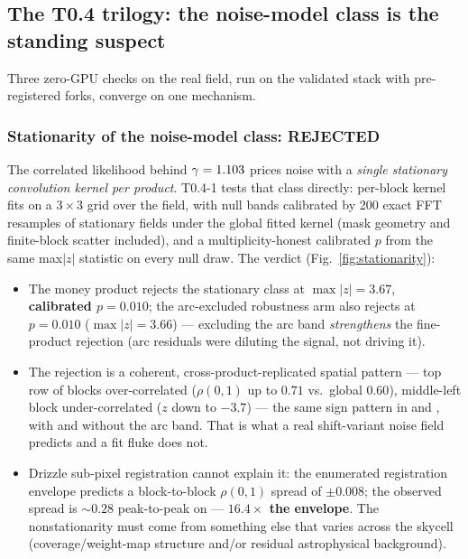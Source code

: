 \subsection{The T0.4 trilogy: the noise-model class is the standing suspect}
\label{sec:t04}

Three zero-GPU checks on the real field, run on the validated stack with
pre-registered forks, converge on one mechanism.

\subsubsection{Stationarity of the noise-model class: REJECTED}
\label{sec:t041}

The correlated likelihood behind $\gamma=1.103$ prices noise with a
\emph{single stationary convolution kernel per product}. T0.4-1 tests that
class directly: per-block kernel fits on a $3\times3$ grid over the field,
with null bands calibrated by 200 exact FFT resamples of stationary fields
under the global fitted kernel (mask geometry and finite-block scatter
included), and a multiplicity-honest calibrated $p$ from the same
max$|z|$ statistic on every null draw. The verdict
(Fig.~\ref{fig:stationarity}):

\begin{itemize}
\item The money product  rejects the stationary class at
$\max|z|=3.67$, \textbf{calibrated $p=0.010$}; the arc-excluded 
robustness arm also rejects at $p=0.010$ ($\max|z|=3.66$) --- excluding the
arc band \emph{strengthens} the fine-product rejection (arc residuals were
diluting the signal, not driving it).
\item The rejection is a coherent, cross-product-replicated spatial pattern
--- top row of blocks over-correlated ($\rho(0,1)$ up to $0.71$ vs.\ global
$0.60$), middle-left block under-correlated ($z$ down to $-3.7$) --- the same
sign pattern in  and , with and without the arc band.
That is what a real shift-variant noise field predicts and a fit fluke does
not.
\item Drizzle sub-pixel registration cannot explain it: the enumerated
registration envelope predicts a block-to-block $\rho(0,1)$ spread of
$\pm0.008$; the observed spread is $\sim$$0.28$ peak-to-peak on 
--- \textbf{$16.4\times$ the envelope}. The nonstationarity must come from
something else that varies across the skycell (coverage/weight-map
structure and/or residual astrophysical background).
\end{itemize}

